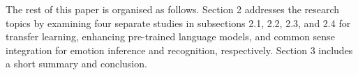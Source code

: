 The rest of this paper is organised as follows. Section 2 addresses the research topics by examining four separate studies in subsections 2.1, 2.2, 2.3, and 2.4 for transfer learning, enhancing pre-trained language models, and common sense integration for emotion inference and recognition, respectively. Section 3 includes a short summary and conclusion.







